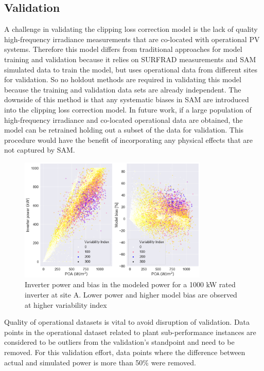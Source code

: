 \documentclass[conference]{IEEEtran}
\begin{document}
\subsection{Validation}
A challenge in validating the clipping loss correction model is the lack of quality high-frequency irradiance measurements that are co-located with operational PV systems. Therefore this model differs from traditional approaches for model training and validation because it relies on SURFRAD measurements and SAM simulated data to train the model, but uses operational data from different sites for validation. So no holdout methods are required in validating this model because the training and validation data sets are already independent. The downside of this method is that any systematic biases in SAM are introduced into the clipping loss correction model. In future work, if a large population of high-frequency irradiance and co-located operational data are obtained, the model can be retrained holding out a subset of the data for validation. This procedure would have the benefit of incorporating any physical effects that are not captured by SAM.


\begin{figure}[htbp]
\centerline{\includegraphics[width=9cm]{DCS_Inv_ModelBias_POA_with_VI.png}}
\caption{Inverter power and bias in the modeled power for a 1000 kW rated inverter at site A. Lower power and higher model bias are observed at higher variability index}
\label{fig:inverter-power-model-bias}
\end{figure}

Quality of operational datasets is vital to avoid disruption of validation. Data points in the operational dataset related to plant sub-performance instances are considered to be outliers from the validation's standpoint and need to be removed. For this validation effort, data points where the difference between actual and simulated power is more than 50\% were removed. 
\end{document}
